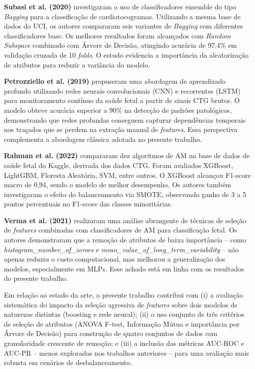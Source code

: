 \documentclass[12pt, a4paper]{article}
\begin{document}
\textbf{Subasi et al. (2020)} \cite{subasi2020} investigaram o uso de classificadores ensemble
do tipo \textit{Bagging} para a classificação de cardiotocogramas. Utilizando a mesma base de
dados do UCI, os autores compararam seis variantes de \textit{Bagging} com diferentes
classificadores base. Os melhores resultados foram alcançados com \textit{Random Subspace}
combinado com Árvore de Decisão, atingindo acurácia de 97,4\% em validação cruzada de 10
\textit{folds}. O estudo evidencia a importância da aleatorização de atributos para reduzir a
variância do modelo.

\textbf{Petrozziello et al. (2019)} \cite{petrozziello2019} propuseram uma abordagem de
aprendizado profundo utilizando redes neurais convolucionais (CNN) e recorrentes (LSTM) para
monitoramento contínuo da saúde fetal a partir de sinais CTG brutos. O modelo obteve acurácia
superior a 90\% na detecção de padrões patológicos, demonstrando que redes profundas conseguem
capturar dependências temporais nos traçados que se perdem na extração manual de \textit{features}.
Essa perspectiva complementa a abordagem clássica adotada no presente trabalho.

\textbf{Rahman et al. (2022)} \cite{rahman2022} compararam dez algoritmos de AM na base de
dados de saúde fetal do Kaggle, derivada dos dados CTG. Foram avaliados XGBoost, LightGBM,
Floresta Aleatória, SVM, entre outros. O XGBoost alcançou F1-score macro de 0{,}94, sendo o
modelo de melhor desempenho. Os autores também investigaram o efeito do balanceamento via
SMOTE, observando ganho de 3 a 5 pontos percentuais no F1-score das classes minoritárias.

\textbf{Verma et al. (2021)} \cite{verma2021} realizaram uma análise abrangente de técnicas de
seleção de \textit{features} combinadas com classificadores de AM para classificação fetal. Os
autores demonstraram que a remoção de atributos de baixa importância -- como \textit{histogram\_number\_of\_zeroes}
e \textit{mean\_value\_of\_long\_term\_variability} -- não apenas reduziu o custo computacional, mas
melhorou a generalização dos modelos, especialmente em MLPs. Esse achado está em linha com os
resultados do presente trabalho.

Em relação ao estado da arte, o presente trabalho contribui com (i) a avaliação sistemática do
impacto da seleção agressiva de \textit{features} sobre dois modelos de naturezas distintas
(boosting e rede neural); (ii) o uso conjunto de três critérios de seleção de atributos
(ANOVA F-test, Informação Mútua e importância por Árvore de Decisão) para construção de quatro
conjuntos de dados com granularidade crescente de remoção; e (iii) a inclusão das métricas
AUC-ROC e AUC-PR -- menos exploradas nos trabalhos anteriores -- para uma avaliação mais robusta
em cenários de desbalanceamento.
\end{document}
